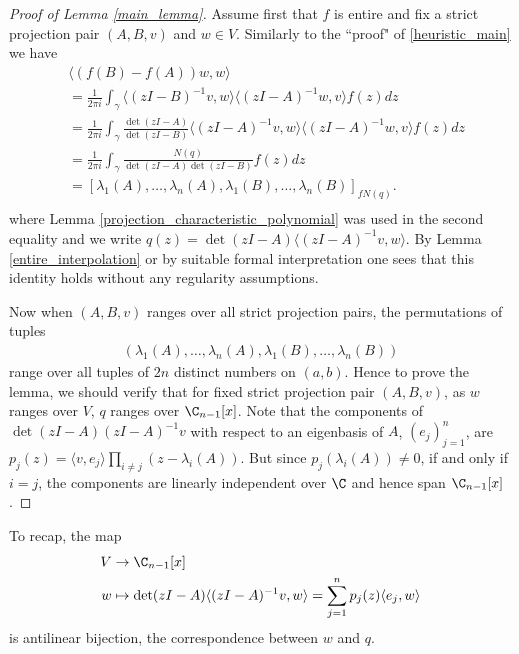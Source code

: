 \begin{proof}[Proof of Lemma \ref{main_lemma}]
	Assume first that $f$ is entire and fix a strict projection pair $(A, B, v)$ and $w \in V$. Similarly to the ``proof" of \ref{heuristic_main} we have
	\begin{align*}
		&\langle (f(B) - f(A)) w, w \rangle \\
		&= \frac{1}{2 \pi i}\int_{\gamma} \langle (z I - B)^{-1} v, w \rangle  \langle (z I - A)^{-1} w, v \rangle f(z) dz \\
		&= \frac{1}{2 \pi i}\int_{\gamma} \frac{\det(z I - A)}{\det(z I - B)}\langle (z I - A)^{-1} v, w \rangle  \langle (z I - A)^{-1} w, v \rangle f(z) dz \\
		&= \frac{1}{2 \pi i}\int_{\gamma} \frac{N(q)}{\det(z I - A) \det(z I - B)} f(z) dz \\
		&= [\lambda_{1}(A), \ldots, \lambda_{n}(A), \lambda_{1}(B), \ldots, \lambda_{n}(B)]_{f N(q)}. \\
	\end{align*}
	where Lemma \ref{projection_characteristic_polynomial} was used in the second equality and we write $q(z) = \det(z I - A) \langle (z I - A)^{-1} v, w \rangle$. By Lemma \ref{entire_interpolation} or by suitable formal interpretation one sees that this identity holds without any regularity assumptions.

	Now when $(A, B, v)$ ranges over all strict projection pairs, the permutations of tuples
	\begin{align}
	(\lambda_{1}(A), \ldots, \lambda_{n}(A), \lambda_{1}(B), \ldots, \lambda_{n}(B))
	\end{align}
	range over all tuples of $2 n$ distinct numbers on $(a, b)$. Hence to prove the lemma, we should verify that for fixed strict projection pair $(A, B, v)$, as $w$ ranges over $V$, $q$ ranges over $\C_{n - 1}[x]$. Note that the components of $\det(z I - A)(z I - A)^{-1} v$ with respect to an eigenbasis of $A$, $(e_{j})_{j = 1}^{n}$, are $p_{j}(z) =  \langle v, e_{j} \rangle \prod_{i \neq j}(z - \lambda_{i}(A))$. But since $p_{j}(\lambda_{i}(A)) \neq 0$, if and only if $i = j$, the components are linearly independent over $\C$ and hence span $\C_{n - 1}[x]$.
\end{proof}

	To recap, the map
	\begin{align*}
		V &\to \C_{n - 1}[x] \\
		w &\mapsto \det(z I - A) \langle (z I - A)^{-1} v, w \rangle = \sum_{j = 1}^{n} p_{j}(z) \langle e_{j}, w \rangle
	\end{align*}
	is antilinear bijection, the correspondence between $w$ and $q$.

